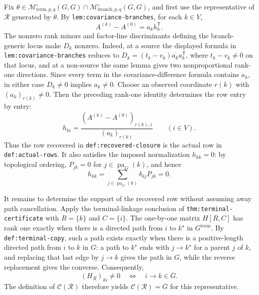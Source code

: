 Fix \(\theta\in\mathcal M^{\circ}_{\mathrm{term},p,q}(G,G)\cap
\mathcal M^{\circ}_{\mathrm{branch},p,q}(G,G)\), and first use the representative of
\(\mathcal R\) generated by \(\theta\).  By \texttt{lem:covariance-branches}, for
each \(k\in V\),
\[
 A^{(k)}-A^{(0)}=a_kh_k^{\mathsf T}.
\]
The nonzero rank minors and factor-line discriminants defining the branch-generic
locus make \(D_k\) nonzero.  Indeed, at a source the displayed formula in
\texttt{lem:covariance-branches} reduces to
\(D_k=(t_k-v_k)a_ka_k^{\mathsf T}\), where \(t_k-v_k\ne0\) on that locus, and at
a non-source the same lemma gives two nonproportional rank-one directions.  Since
every term in the covariance-difference formula contains \(a_k\), in either case
\(D_k\ne0\) implies \(a_k\ne0\).  Choose an observed coordinate \(r(k)\) with
\((a_k)_{r(k)}\ne0\).  Then the preceding rank-one identity determines the row
entry by entry:
\[
 h_{ki}=\frac{(A^{(k)}-A^{(0)})_{r(k),i}}{(a_k)_{r(k)}}
 \qquad(i\in V).
\]
Thus the row recovered in \texttt{def:recovered-closure} is the actual row in
\texttt{def:actual-rows}.  It also satisfies the imposed normalization
\(h_{kk}=0\): by topological ordering, \(P_{jk}=0\) for
\(j\in\operatorname{pa}_G(k)\), and hence
\[
 h_{kk}=\sum_{j\in\operatorname{pa}_G(k)}\delta_{kj}P_{jk}=0.
\]

It remains to determine the support of the recovered row without assuming away
path cancellation.  Apply the terminal-linkage conclusion of
\texttt{thm:terminal-certificate} with \(R=\{k\}\) and \(C=\{i\}\).  The
one-by-one matrix \(H[R,C]\) has rank one exactly when there is a directed path
from \(i\) to \(k^{\star}\) in \(G^{\mathrm{term}}\).  By
\texttt{def:terminal-copy}, such a path exists exactly when there is a
positive-length directed path from \(i\) to \(k\) in \(G\): a path to
\(k^{\star}\) ends with \(j\to k^{\star}\) for a parent \(j\) of \(k\), and
replacing that last edge by \(j\to k\) gives the path in \(G\), while the reverse
replacement gives the converse.  Consequently,
\[
 (H_{\mathcal R})_{ki}\ne0
 \quad\Longleftrightarrow\quad
 i\to k\in\overline G.
\]
The definition of \(\mathcal C(\mathcal R)\) therefore yields
\(\mathcal C(\mathcal R)=\overline G\) for this representative.


